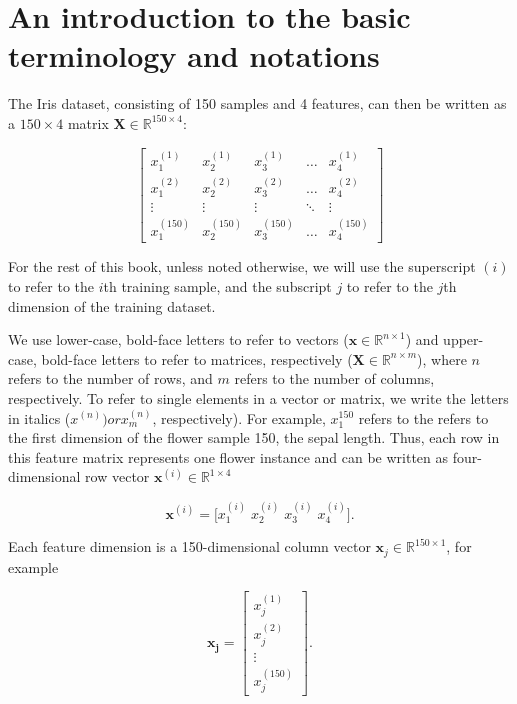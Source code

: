 \documentclass{report}
\begin{document}
\section{An introduction to the basic terminology and notations}

\newpage

The Iris dataset, consisting of 150 samples and 4 features, can then be written as a $150 \times 4$ matrix $\mathbf{X} \in \mathbb{R}^{150 \times 4}:$

\[
\begin{bmatrix}
    x_{1}^{(1)} & x_{2}^{(1)} & x_{3}^{(1)} & \dots  & x_{4}^{(1)} \\
    x_{1}^{(2)} & x_{2}^{(2)} & x_{3}^{(2)} & \dots  & x_{4}^{(2)} \\
    \vdots & \vdots & \vdots & \ddots & \vdots \\
    x_{1}^{(150)} & x_{2}^{(150)} & x_{3}^{(150)} & \dots  & x_{4}^{(150)}
\end{bmatrix}
\]

For the rest of this book, unless noted otherwise, we will use the superscript $(i)$ to refer to the $i$th training sample, and the subscript $j$ to refer to the $j$th dimension of the training dataset. 

We use lower-case, bold-face letters to refer to vectors ($\mathbf{x} \in \mathbb{R}^{n \times 1}$) and upper-case, bold-face letters to refer to matrices, respectively ($\mathbf{X} \in \mathbb{R}^{n \times m}$), where $n$ refers to the number of rows, and $m$ refers to the number of columns, respectively. To refer to single elements in a vector or matrix, we write the letters in italics ($x^{(n)}) or x^{(n)}_{m}$, respectively). For example, $x^{150}_1$ refers to the refers to the first dimension of the flower sample 150, the sepal length. Thus, each row in this feature matrix represents one flower instance and can be written as four-dimensional row vector $\mathbf{x}^{(i)} \in \mathbb{R}^{1 \times 4}$

\[ \mathbf{x}^{(i)} = \bigg[x^{(i)}_1 \; x^{(i)}_2 \; x^{(i)}_3 \; x^{(i)}_4 \bigg]. \]

Each feature dimension is a 150-dimensional column vector $\mathbf{x}_{j} \in \mathbb{R}^{150 \times 1}$, for example

\[
\mathbf{x_j} = \begin{bmatrix}
    x_{j}^{(1)}  \\
    x_{j}^{(2)}  \\
    \vdots  \\
    x_{j}^{(150)}
\end{bmatrix}
.\]
\end{document}

